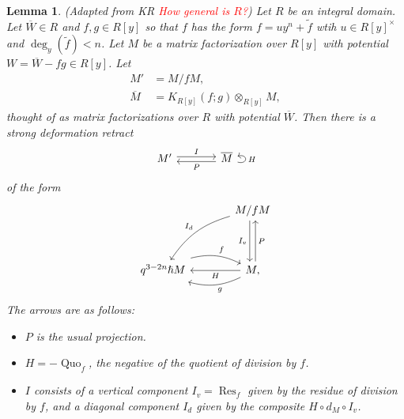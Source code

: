 \documentclass{article}
\DeclareMathOperator{\Res}{Res}
\DeclareMathOperator{\Quo}{Quo}
\newcommand{\sdr}[5]{%
  \begin{tikzcd}[column sep=large, ampersand replacement=\&]
    {#1} \arrow[r, "#3", shift left=0.5ex,] \arrow[r, leftarrow, "#4", shift right=0.5ex, swap] \& 
    {#2} \arrow[loop right, distance=1em, in=15, out=-15, "#5",swap]
  \end{tikzcd}%
}
\theoremstyle{plain} %
\newtheorem{lemma}[theorem]{Lemma}
\theoremstyle{definition} %
\theoremstyle{remark} %
\begin{document}
\begin{lemma}\label{sdrlemma}    (Adapted from KR \textcolor{red}{How general is $R$?}) Let $R$ be an integral domain. Let $\overline W\in R$ and $f,g\in R[y]$ so that $f$ has the form $f=uy^n+\tilde f$ wtih $u\in R[y]^\times$ and $\deg_y(\tilde f)<n$. Let $M$ be a matrix factorization over $R[y]$ with potential $W=\overline W-fg\in R[y]$. Let 
\begin{align*}M'&=M/fM,\\
\overline M &= K_{R[y]}(f;g)\otimes_{R[y]} M,\end{align*}
thought of as matrix factorizations over $R$ with potential $\overline W$.
Then there is a strong deformation retract
$$\sdr{M'}{\overline M}{I}{P}{H}$$
of the form
 $$\begin{tikzcd}[column sep=large, ]
    &M/fM\ar[dd, shift right=0.6ex, "I_v", swap]\ar[dd, leftarrow, shift left=0.6ex, "P"]\arrow[ddl, "I_d", bend right=20, swap]\\\\
    q^{3-2n}\hslash M\arrow[r, "f", shift left=0.5ex, bend left=20]& M\ar[l, "H"]\arrow[l, "g", shift left=0.5ex, bend left=20], 
\end{tikzcd}$$
The arrows are as follows:
\begin{itemize}
    \item $P$ is the usual projection.
    \item $H=-\Quo_f$, the negative of the quotient of division by $f$.
    \item $I$ consists of a vertical component $I_v=\Res_f$ given by the residue of division by $f$, and a diagonal component $I_d$ given by the composite $H\circ d_M\circ I_v$.
\end{itemize}
\end{lemma}
\end{document}
